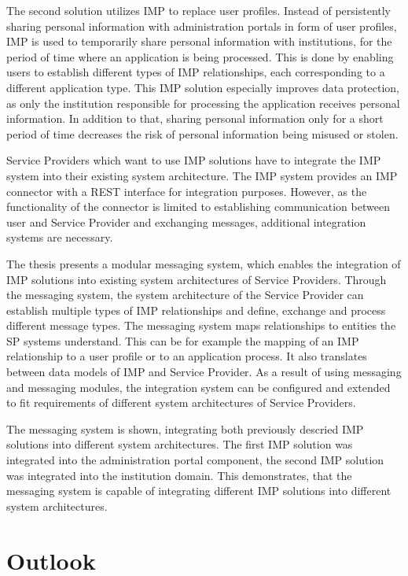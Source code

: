 The second solution utilizes IMP to replace user profiles. Instead of persistently sharing personal information with administration portals in form of user profiles, IMP is used to temporarily share personal information with institutions, for the period of time where an application is being processed. This is done by enabling users to establish different types of IMP relationships, each corresponding to a different application type.
This IMP solution especially improves data protection, as only the institution responsible for processing the application receives personal information. In addition to that, sharing personal information only for a short period of time decreases the risk of personal information being misused or stolen.

Service Providers which want to use IMP solutions have to integrate the IMP system into their existing system architecture.
The IMP system provides an IMP connector with a REST interface for integration purposes. However, as the functionality of the connector is limited to establishing communication between user and Service Provider and exchanging messages, additional integration systems are necessary.

The thesis presents a modular messaging system, which enables the integration of IMP solutions into existing system architectures of Service Providers. Through the messaging system, the system architecture of the Service Provider can 
establish multiple types of IMP relationships and define, exchange and process different message types. The messaging system maps relationships to entities the SP systems understand. This can be for example the mapping of an IMP relationship to a user profile or to an application process. It also translates between data models of IMP and Service Provider. As a result of using messaging and messaging modules, the integration system can be configured and extended to fit requirements of different system architectures of Service Providers.

The messaging system is shown, integrating both previously descried IMP solutions into different system architectures. The first IMP solution was integrated into the administration portal component, the second IMP solution was integrated into the institution domain. This demonstrates, that the messaging system is capable of integrating different IMP solutions into different system architectures.

\section{Outlook}

